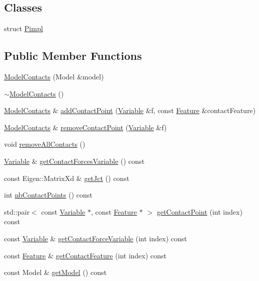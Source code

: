 \subsection*{Classes}
\begin{DoxyCompactItemize}
\item 
struct \hyperlink{structocra_1_1ModelContacts_1_1Pimpl}{Pimpl}
\end{DoxyCompactItemize}
\subsection*{Public Member Functions}
\begin{DoxyCompactItemize}
\item 
\hyperlink{classocra_1_1ModelContacts_abf9089d7762205480b46005544883e60}{Model\+Contacts} (Model \&model)
\item 
\hyperlink{classocra_1_1ModelContacts_ab8ca6e653ccacdff73ae10e7c0750bbf}{$\sim$\+Model\+Contacts} ()
\item 
\hyperlink{classocra_1_1ModelContacts}{Model\+Contacts} \& \hyperlink{classocra_1_1ModelContacts_a209ae06f99698291a84e043fa7b8e32e}{add\+Contact\+Point} (\hyperlink{classocra_1_1Variable}{Variable} \&f, const \hyperlink{classocra_1_1Feature}{Feature} \&contact\+Feature)
\item 
\hyperlink{classocra_1_1ModelContacts}{Model\+Contacts} \& \hyperlink{classocra_1_1ModelContacts_a4e2267a563e01c78c9aff1fced5cb83b}{remove\+Contact\+Point} (\hyperlink{classocra_1_1Variable}{Variable} \&f)
\item 
void \hyperlink{classocra_1_1ModelContacts_ad633a3df5915ee16b3a55b8169e4006e}{remove\+All\+Contacts} ()
\item 
\hyperlink{classocra_1_1Variable}{Variable} \& \hyperlink{classocra_1_1ModelContacts_a6668bfd6c112b849536b701cd2d1097c}{get\+Contact\+Forces\+Variable} () const
\item 
const Eigen\+::\+Matrix\+Xd \& \hyperlink{classocra_1_1ModelContacts_ac3c23337fdfac47ddf40b7e3332e31fc}{get\+Jct} () const
\item 
int \hyperlink{classocra_1_1ModelContacts_ab06a70136062c53c28344ce471f0bd73}{nb\+Contact\+Points} () const
\item 
std\+::pair$<$ const \hyperlink{classocra_1_1Variable}{Variable} $\ast$, const \hyperlink{classocra_1_1Feature}{Feature} $\ast$ $>$ \hyperlink{classocra_1_1ModelContacts_a6fde5f06051fafaebd07a1ebb80bd82c}{get\+Contact\+Point} (int index) const
\item 
const \hyperlink{classocra_1_1Variable}{Variable} \& \hyperlink{classocra_1_1ModelContacts_aede709082b66b0c30aa57ac4cd7094ad}{get\+Contact\+Force\+Variable} (int index) const
\item 
const \hyperlink{classocra_1_1Feature}{Feature} \& \hyperlink{classocra_1_1ModelContacts_a40f66a2528a3f7c0538172987de7c919}{get\+Contact\+Feature} (int index) const
\item 
const Model \& \hyperlink{classocra_1_1ModelContacts_a188e822de7692fba999836b1ffb7f376}{get\+Model} () const
\end{DoxyCompactItemize}
